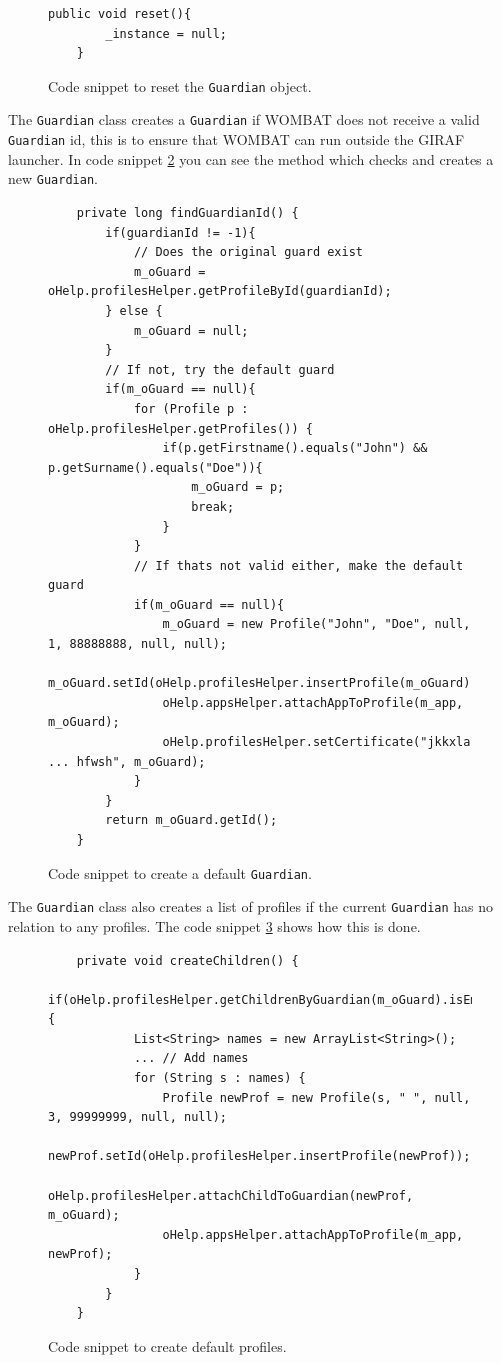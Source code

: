 \begin{description}
\begin{figure}[H]
\begin{lstlisting}
public void reset(){
		_instance = null;
	}
\end{lstlisting}
\caption{Code snippet to reset the \texttt{Guardian} object.}%
\label{code:guardianreset}%
\end{figure}

The \texttt{Guardian} class creates a \texttt{Guardian} if WOMBAT does not receive a valid \texttt{Guardian} id, this is to ensure that WOMBAT can run outside the GIRAF launcher. In code snippet \ref{code:createGuardian} you can see the method which checks and creates a new \texttt{Guardian}.

\begin{figure}[H]
\begin{lstlisting}
	private long findGuardianId() {
		if(guardianId != -1){
			// Does the original guard exist
			m_oGuard = oHelp.profilesHelper.getProfileById(guardianId);
		} else {
			m_oGuard = null;
		}
		// If not, try the default guard
		if(m_oGuard == null){
			for (Profile p : oHelp.profilesHelper.getProfiles()) {
				if(p.getFirstname().equals("John") && p.getSurname().equals("Doe")){
					m_oGuard = p;
					break;
				}
			}
			// If thats not valid either, make the default guard
			if(m_oGuard == null){
				m_oGuard = new Profile("John", "Doe", null, 1, 88888888, null, null);				
				m_oGuard.setId(oHelp.profilesHelper.insertProfile(m_oGuard));
				oHelp.appsHelper.attachAppToProfile(m_app, m_oGuard);
				oHelp.profilesHelper.setCertificate("jkkxla ... hfwsh", m_oGuard);
			}
		} 
		return m_oGuard.getId();
	}
\end{lstlisting}
\caption{Code snippet to create a default \texttt{Guardian}.}%
\label{code:createGuardian}%
\end{figure}

The \texttt{Guardian} class also creates a list of profiles if the current \texttt{Guardian} has no relation to any profiles. The code snippet \ref{code:createChildren} shows how this is done.
	
	\begin{figure}[H]
\begin{lstlisting}
	private void createChildren() {		
		if(oHelp.profilesHelper.getChildrenByGuardian(m_oGuard).isEmpty()){
			List<String> names = new ArrayList<String>();
			... // Add names			
			for (String s : names) {
				Profile newProf = new Profile(s, " ", null, 3, 99999999, null, null);
				newProf.setId(oHelp.profilesHelper.insertProfile(newProf));
				oHelp.profilesHelper.attachChildToGuardian(newProf, m_oGuard);
				oHelp.appsHelper.attachAppToProfile(m_app, newProf);
			}
		}
	}
\end{lstlisting}
\caption{Code snippet to create default profiles.}%
\label{code:createChildren}%
\end{figure}


\end{description}
